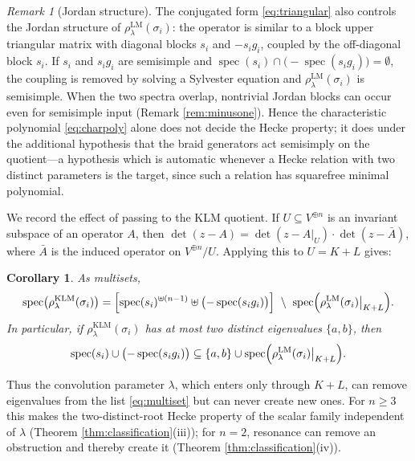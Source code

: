 \documentclass[11pt]{article}
\newtheorem{corollary}[theorem]{Corollary}
\theoremstyle{definition}
\theoremstyle{remark}
\newtheorem{remark}[theorem]{Remark}
\newcommand{\spec}{\operatorname{spec}}
\newcommand{\rLMl}{\rho^{\mathrm{LM}}_{\lambda}}
\newcommand{\rKLM}{\rho^{\mathrm{KLM}}_{\lambda}}
\begin{document}
\begin{remark}[Jordan structure]\label{rem:jordan}
The conjugated form \eqref{eq:triangular} also controls the Jordan
structure of $\rLMl(\sigma_i)$: the operator is similar to a block upper
triangular matrix with diagonal blocks $s_i$ and $-s_i g_i$, coupled by
the off-diagonal block $s_i$. If $s_i$ and $s_i g_i$ are semisimple and
$\spec(s_i) \cap \bigl(-\spec(s_i g_i)\bigr) = \emptyset$, the coupling
is removed by solving a Sylvester equation and $\rLMl(\sigma_i)$ is
semisimple. When the two spectra overlap, nontrivial Jordan blocks can
occur even for semisimple input (Remark \ref{rem:minusone}). Hence the
characteristic polynomial \eqref{eq:charpoly} alone does not decide the
Hecke property; it does under the additional hypothesis that the braid
generators act semisimply on the quotient---a hypothesis which is
automatic whenever a Hecke relation with two distinct parameters is the
target, since such a relation has squarefree minimal polynomial.
\end{remark}

We record the effect of passing to the KLM quotient. If
$U \subseteq V^{\oplus n}$ is an invariant subspace of an operator $A$,
then $\det(z - A) = \det(z - A|_{U})\cdot\det(z - \bar A)$, where
$\bar A$ is the induced operator on $V^{\oplus n}/U$. Applying this to
$U = K + L$ gives:

\begin{corollary}\label{cor:quotient}
As multisets,
\[
\spec\bigl(\rKLM(\sigma_i)\bigr)
= \Bigl[\spec(s_i)^{\uplus(n-1)} \uplus \bigl(-\spec(s_i g_i)\bigr)\Bigr]
\ \setminus\ \spec\Bigl(\rLMl(\sigma_i)\big|_{K+L}\Bigr).
\]
In particular, if $\rKLM(\sigma_i)$ has at most two distinct eigenvalues
$\{a, b\}$, then
\[
\spec(s_i) \cup \bigl(-\spec(s_i g_i)\bigr) \subseteq
\{a, b\} \cup \spec\Bigl(\rLMl(\sigma_i)\big|_{K+L}\Bigr).
\]
\end{corollary}

Thus the convolution parameter $\lambda$, which enters only through
$K + L$, can remove eigenvalues from the list \eqref{eq:multiset} but can
never create new ones. For $n \geq 3$ this makes the two-distinct-root
Hecke property of the scalar family independent of $\lambda$ (Theorem
\ref{thm:classification}(iii)); for $n = 2$, resonance can remove an
obstruction and thereby create it (Theorem
\ref{thm:classification}(iv)).
\end{document}
